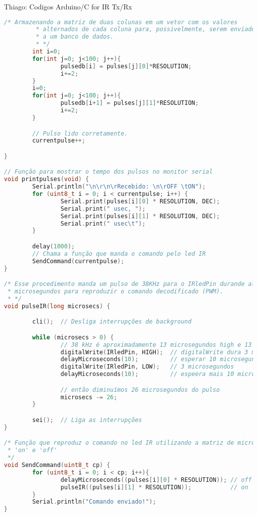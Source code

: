 \begin{section}{Thiago: Codigos Arduino/C for IR Tx/Rx}
\begin{lstlisting}[language=c, caption={fun\c{c}\~{a}o $grant\_db()$}, label={lst:dbphi8}]
		/* Armazenando a matriz de duas colunas em um vetor com os valores
		 * alternados de cada coluna para, possivelmente, serem enviados
		 * a um banco de dados.
		 * */
		int i=0;
		for(int j=0; j<100; j++){
				pulsedb[i] = pulses[j][0]*RESOLUTION;
				i+=2; 
		}
		i=0;
		for(int j=0; j<100; j++){
				pulsedb[i+1] = pulses[j][1]*RESOLUTION;
				i+=2; 
		}

		// Pulso lido corretamente. 
		currentpulse++;

}

// Função para mostrar o tempo dos pulsos no monitor serial
void printpulses(void) {
		Serial.println("\n\r\n\rRecebido: \n\rOFF \tON");
		for (uint8_t i = 0; i < currentpulse; i++) {
				Serial.print(pulses[i][0] * RESOLUTION, DEC);
				Serial.print(" usec, ");
				Serial.print(pulses[i][1] * RESOLUTION, DEC);
				Serial.print(" usec\t");
		}

		delay(1000);
		// Chama a função que manda o comando pelo led IR
		SendCommand(currentpulse);
}

/* Esse procedimento manda um pulso de 38KHz para o IRledPin durande alguns 
 * microsegundos para reproduzir o comando decodificado (PWM).
 * */
void pulseIR(long microsecs) {

		cli();  // Desliga interrupções de background

		while (microsecs > 0) {
				// 38 kHz é aproximadamente 13 microsegundos high e 13 microsegundos low
				digitalWrite(IRledPin, HIGH);  // digitalWrite dura 3 microsegundos
				delayMicroseconds(10);         // esperar 10 microsegundos
				digitalWrite(IRledPin, LOW);   // 3 microsegundos
				delayMicroseconds(10);         // espeera mais 10 microsegundos

				// então diminuímos 26 microsegundos do pulso
				microsecs -= 26;
		}

		sei();  // Liga as interrupções
}

/* Função que reproduz o comando no led IR utilizando a matriz de microsegundos
 * 'on' e 'off'
 */
void SendCommand(uint8_t cp) {
		for (uint8_t i = 0; i < cp; i++){
				delayMicroseconds((pulses[i][0] * RESOLUTION)); // off
				pulseIR((pulses[i][1] * RESOLUTION));           // on
		}
		Serial.println("Comando enviado!");
}
\end{lstlisting}
\end{section}
